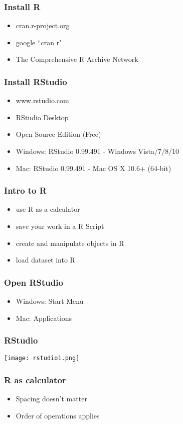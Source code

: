 \documentclass{beamer}
\begin{document}
\begin{frame}
 \frametitle<+->{Install R}
 \begin{itemize}
   \item cran.r-project.org
   \item google ``cran r"
   \item The Comprehensive R Archive Network
 \end{itemize}
\end{frame}

\begin{frame}
 \frametitle<+->{Install RStudio}
 \begin{itemize}
   \item www.rstudio.com
   \item RStudio Desktop
   \item Open Source Edition (Free)
   \item Windows: RStudio 0.99.491 - Windows Vista/7/8/10
   \item Mac: RStudio 0.99.491 - Mac OS X 10.6+ (64-bit)
 \end{itemize}
\end{frame}

\begin{frame}
 \frametitle<+->{Intro to R}
 \begin{itemize}
   \item use R as a calculator
   \item save your work in a R Script
   \item create and manipulate objects in R
   \item load dataset into R
 \end{itemize}
\end{frame}


\begin{frame}
 \frametitle<+->{Open RStudio}
 \begin{itemize}
   \item Windows: Start Menu
   \item Mac: Applications
 \end{itemize}
\end{frame}

\begin{frame}
 \frametitle{RStudio}
 \texttt{[image: rstudio1.png]}
\end{frame}

\begin{frame}
 \frametitle<+->{R as calculator}
 \begin{itemize}
   \item Spacing doesn't matter
   \item Order of operations applies
 \end{itemize}
\end{frame}
\end{document}
